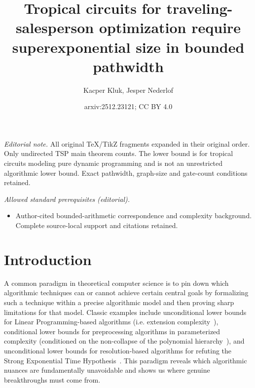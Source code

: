 \documentclass[11pt,a4paper]{article}
\title{Tropical circuits for traveling-salesperson optimization require superexponential size in bounded pathwidth}
\author{Kacper Kluk, Jesper Nederlof}
\date{arxiv:2512.23121; CC BY 4.0}
\begin{document}
\maketitle
\noindent\textit{Editorial note.} All original TeX/TikZ fragments expanded in their original order. Only undirected TSP main theorem counts. The lower bound is for tropical circuits modeling pure dynamic programming and is not an unrestricted algorithmic lower bound. Exact pathwidth, graph-size and gate-count conditions retained.\par\medskip
\noindent\textit{Allowed standard prerequisites (editorial).}\begin{itemize}
\item Author-cited bounded-arithmetic correspondence and complexity background. Complete source-local support and citations retained.
\end{itemize}\medskip

\section{Introduction}
A common paradigm in theoretical computer science is to pin down which algorithmic techniques can or cannot achieve certain central goals by formalizing such a technique within a precise algorithmic model and then proving sharp limitations for that model. Classic examples include unconditional lower bounds for Linear Programming-based algorithms (i.e. extension complexity~\cite{FioriniMPTW15,Rothvoss17}), conditional lower bounds for preprocessing algorithms in parameterized complexity (conditioned on the non-collapse of the polynomial hierarchy~\cite{BodlaenderDFH09,FortnowS11}), and unconditional lower bounds for resolution-based algorithms for refuting the Strong Exponential Time Hypothesis~\cite{BeckI13}. This paradigm reveals which algorithmic nuances are fundamentally unavoidable and shows us where genuine breakthroughs must come from.
\end{document}
